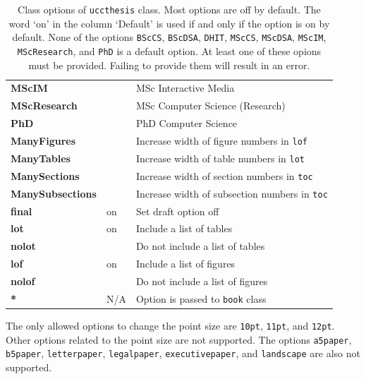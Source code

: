 \documentclass[MScDSA]{uccthesis}
\begin{document}
\begin{table}[tbp]
\begin{tabular}{lll}
      \\\textbf{MScIM}    &     & MSc Interactive Media
      \\\textbf{MScResearch} &  & MSc Computer Science (Research)
      \\\textbf{PhD}      &     & PhD Computer Science
      \\\midrule
        \textbf{ManyFigures}   &    & Increase width of figure numbers in \texttt{lof}
      \\\textbf{ManyTables}    &    & Increase width of table numbers in \texttt{lot}
      \\\textbf{ManySections}  &    & Increase width of section numbers in \texttt{toc}
      \\\textbf{ManySubsections}&    & Increase width of subsection numbers in \texttt{toc}
      \\\textbf{final}    & on  & Set draft option off
      \\\textbf{lot}      & on  & Include a list of tables
      \\\textbf{nolot}    &     & Do not include a list of tables
      \\\textbf{lof}      & on  & Include a list of figures
      \\\textbf{nolof}    &     & Do not include a list of figures
      \\\textbf{*}        & N/A & Option is passed to \texttt{book} class
      \\\bottomrule
      \end{tabular}
      \caption[Class options of \protect\texttt{uccthesis} class.]
              {\label{tab:options}Class options of \protect\texttt{uccthesis} class.
               Most options are off by default.
               The word `on' in the column `Default' is used
                if and only if the option is on by default.
               None of the options
                \texttt{BScCS}, \texttt{BScDSA}, \texttt{DHIT},
                \texttt{MScCS}, \texttt{MScDSA}, \texttt{MScIM}, \texttt{MScResearch}, and
                \texttt{PhD}
                is a default option.
               At least one of these opions must be provided.
               Failing to provide them will result in an error.}
      \end{table}
      The only allowed options to change the point size are
       \texttt{10pt},
       \texttt{11pt}, and
       \texttt{12pt}.
      Other options related to the point size are not supported.
      The options
       \texttt{a5paper},
       \texttt{b5paper},
       \texttt{letterpaper},
       \texttt{legalpaper},
       \texttt{executivepaper}, and
       \texttt{landscape}
       are also not supported.
\end{document}
